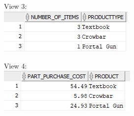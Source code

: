 \documentclass[12pt]{article}
\begin{document}
\begin{enumerate}
		\begin{center}
				View 3:\\
				\includegraphics[scale=1.0]{completed_diags/states/view3}
		\end{center}		
		\begin{center}
				View 4:\\
				\includegraphics[scale=1.0]{completed_diags/states/view4}
		\end{center}	
\end{enumerate}
\end{document}

